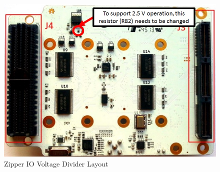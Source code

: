 \documentclass{article}
\begin{document}
	\begin{figure}[ht]
		\begin{center}
		\includegraphics[scale=0.35]{zipper_layout}
		\caption{Zipper IO Voltage Divider Layout}
		\label{fig:zipper_layout}
		\end{center}
	\end{figure}
\pagebreak
\end{document}
